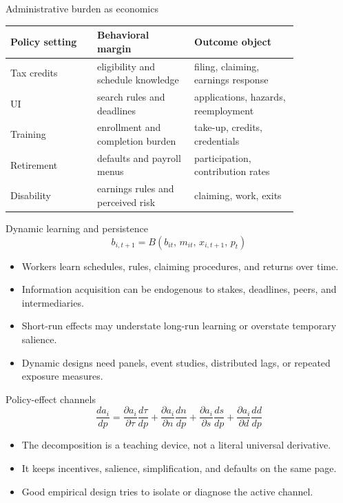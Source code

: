 \documentclass[aspectratio=169,11pt]{beamer}
\begin{document}
\begin{frame}{Administrative burden as economics}
\small
\begin{tabular}{p{0.25\linewidth} p{0.28\linewidth} p{0.30\linewidth}}
\toprule
Policy setting & Behavioral margin & Outcome object \\
\midrule
Tax credits & eligibility and schedule knowledge & filing, claiming, earnings response \\
UI & search rules and deadlines & applications, hazards, reemployment \\
Training & enrollment and completion burden & take-up, credits, credentials \\
Retirement & defaults and payroll menus & participation, contribution rates \\
Disability & earnings rules and perceived risk & claiming, work, exits \\
\bottomrule
\end{tabular}
\end{frame}

\begin{frame}{Dynamic learning and persistence}
\[
b_{i,t+1} = B\!\left(b_{it},\, m_{it},\, x_{i,t+1},\, p_t\right)
\]

\begin{itemize}
    \item Workers learn schedules, rules, claiming procedures, and returns over time.
    \item Information acquisition can be endogenous to stakes, deadlines, peers, and intermediaries.
    \item Short-run effects may understate long-run learning or overstate temporary salience.
    \item Dynamic designs need panels, event studies, distributed lags, or repeated exposure measures.
\end{itemize}
\end{frame}

\begin{frame}{Policy-effect channels}
\[
\frac{d a_i}{d p}
=
\frac{\partial a_i}{\partial \tau}\frac{d\tau}{dp}
+
\frac{\partial a_i}{\partial n}\frac{dn}{dp}
+
\frac{\partial a_i}{\partial s}\frac{ds}{dp}
+
\frac{\partial a_i}{\partial d}\frac{dd}{dp}
\]

\begin{itemize}
    \item The decomposition is a teaching device, not a literal universal derivative.
    \item It keeps incentives, salience, simplification, and defaults on the same page.
    \item Good empirical design tries to isolate or diagnose the active channel.
\end{itemize}
\end{frame}
\end{document}
